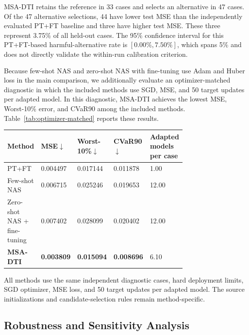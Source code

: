 \documentclass[a4paper,fleqn]{cas-sc}
\begin{document}
MSA-DTI retains the reference in 33 cases and selects an alternative in 47
cases. Of the 47 alternative selections, 44 have lower test MSE than the
independently evaluated PT+FT baseline and three have higher test MSE.
These three represent 3.75\% of all held-out cases. The 95\% confidence
interval for this PT+FT-based harmful-alternative rate is
$[0.00\%,7.50\%]$, which spans 5\% and does not directly validate the
within-run calibration criterion.

Because few-shot NAS and zero-shot NAS with fine-tuning use Adam and Huber
loss in the main comparison, we additionally evaluate an optimizer-matched
diagnostic in which the included methods use SGD, MSE, and 50 target updates
per adapted model. In this
diagnostic, MSA-DTI achieves the lowest MSE, Worst-10\% error, and CVaR90 among
the included methods. Table~\ref{tab:optimizer-matched} reports these results.

\begin{center}
\begin{minipage}{\linewidth}
\label{tab:optimizer-matched}
\centering
\scriptsize
\renewcommand{\arraystretch}{1.07}
\setlength{\tabcolsep}{2.8pt}
\begin{tabularx}{\linewidth}
{Y Z{0.17\linewidth} Z{0.20\linewidth} Z{0.18\linewidth} Z{0.18\linewidth}}
\toprule
Method
& MSE$\downarrow$
& Worst-10\%$\downarrow$
& CVaR90$\downarrow$
& Adapted models per case \\
\midrule
PT+FT & 0.004497 & 0.017144 & 0.011878 & 1.00 \\
Few-shot NAS & 0.006715 & 0.025246 & 0.019653 & 12.00 \\
Zero-shot NAS + fine-tuning & 0.007402 & 0.028099 & 0.020402 & 12.00 \\
\textbf{MSA-DTI} & \textbf{0.003809} & \textbf{0.015094} &
\textbf{0.008696} & 6.10 \\
\bottomrule
\end{tabularx}
\vspace{2pt}
\par\footnotesize
All methods use the same independent diagnostic cases, hard deployment
limits, SGD optimizer, MSE loss, and 50 target updates per adapted model. The
source initializations and candidate-selection rules remain method-specific.
\end{minipage}
\end{center}

\subsection{Robustness and Sensitivity Analysis}
\label{subsec:heterogeneity}
\end{document}
